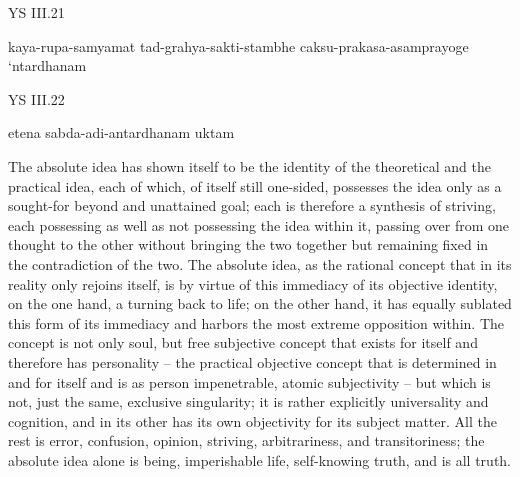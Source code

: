 YS III.21

kaya-rupa-samyamat tad-grahya-sakti-stambhe caksu-prakasa-asamprayoge ‘ntardhanam

YS III.22

etena sabda-adi-antardhanam uktam

The absolute idea has shown itself to be the identity of the theoretical and
the practical idea, each of which, of itself still one-sided, possesses the idea
only as a sought-for beyond and unattained goal; each is therefore a synthesis
of striving, each possessing as well as not possessing the idea within it, passing
over from one thought to the other without bringing the two together but
remaining fixed in the contradiction of the two. The absolute idea, as the
rational concept that in its reality only rejoins itself, is by virtue of this
immediacy of its objective identity, on the one hand, a turning back to life;
on the other hand, it has equally sublated this form of its immediacy and
harbors the most extreme opposition within. The concept is not only soul,
but free subjective concept that exists for itself and therefore has personality –
the practical objective concept that is determined in and for itself and
is as person impenetrable, atomic subjectivity – but which is not, just the
same, exclusive singularity; it is rather explicitly universality and cognition,
and in its other has its own objectivity for its subject matter. All the rest
is error, confusion, opinion, striving, arbitrariness, and transitoriness; the
absolute idea alone is being, imperishable life, self-knowing truth, and is all
truth.

